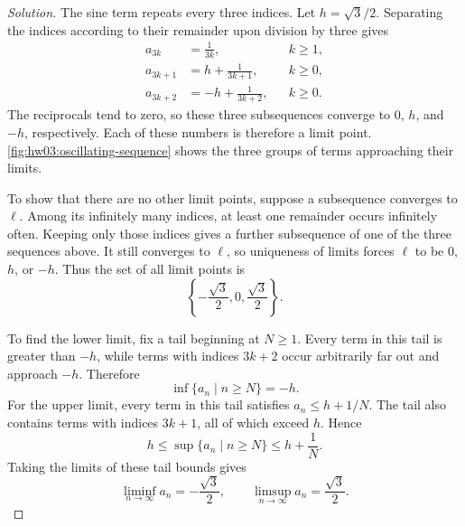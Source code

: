 \begin{proof}[Solution]
  The sine term repeats every three indices. Let $h=\sqrt{3}/2$.
  Separating the indices according to their remainder upon division
  by three gives
  \begin{align*}
    a_{3k}&=\frac{1}{3k}, && k\geq1, \\
    a_{3k+1}&=h+\frac{1}{3k+1}, && k\geq0, \\
    a_{3k+2}&=-h+\frac{1}{3k+2}, && k\geq0.
  \end{align*}
  The reciprocals tend to zero, so these three subsequences converge
  to $0$, $h$, and $-h$, respectively. Each of these numbers is
  therefore a limit point. \autoref{fig:hw03:oscillating-sequence}
  shows the three groups of terms approaching their limits.
  \begin{marginfigure}
    \centering
    
    \caption[Three subsequence limits.]{The first eighteen terms. The dashed lines mark
      $\pm\sqrt{3}/2$; the horizontal axis marks the third limit, $0$.}
    \label{fig:hw03:oscillating-sequence}
  \end{marginfigure}

  To show that there are no other limit points, suppose a subsequence
  converges to $\ell$. Among its infinitely many indices, at least
  one remainder occurs infinitely often. Keeping only those indices
  gives a further subsequence of one of the three sequences above.
  It still converges to $\ell$, so uniqueness of limits forces $\ell$
  to be $0$, $h$, or $-h$. Thus the set of all limit points is
  \[
    \left\{-\frac{\sqrt{3}}{2},0,\frac{\sqrt{3}}{2}\right\}.
  \]

  To find the lower limit, fix a tail beginning at $N\geq1$. Every
  term in this tail is greater than $-h$, while terms with indices
  $3k+2$ occur arbitrarily far out and approach $-h$. Therefore
  \[
    \inf\{a_n\mid n\geq N\}=-h.
  \]
  For the upper limit, every term in this tail satisfies
  $a_n\leq h+1/N$. The tail also contains terms with indices $3k+1$,
  all of which exceed $h$. Hence
  \[
    h\leq\sup\{a_n\mid n\geq N\}\leq h+\frac{1}{N}.
  \]
  Taking the limits of these tail bounds gives
  \[
    \liminf_{n\to\infty}a_n=-\frac{\sqrt{3}}{2},\qquad
    \limsup_{n\to\infty}a_n=\frac{\sqrt{3}}{2}.
  \]
\end{proof}
